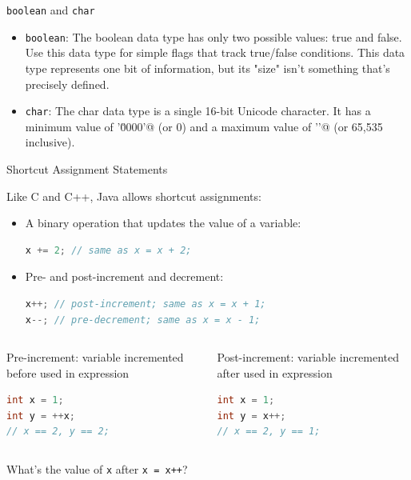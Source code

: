 \documentclass{beamer}
\begin{document}
\begin{frame}[fragile]{{\tt boolean} and {\tt char}}


\begin{itemize}
\item {\tt boolean}: The boolean data type has only two possible values: true and false. Use this data type for simple flags that track true/false conditions. This data type represents one bit of information, but its "size" isn't something that's precisely defined.

\item {\tt char}: The char data type is a single 16-bit Unicode character. It has a minimum value of \verb@'\u0000'@ (or 0) and a maximum value of \verb@'\uffff'@ (or 65,535 inclusive).
\end{itemize}


\end{frame}

\begin{frame}[fragile]{Shortcut Assignment Statements}


Like C and C++, Java allows shortcut assignments:
\begin{itemize}
\item A binary operation that updates the value of a variable:
\begin{lstlisting}[language=Java]
x += 2; // same as x = x + 2;
\end{lstlisting}
\item Pre- and post-increment and decrement:
\begin{lstlisting}[language=Java]
x++; // post-increment; same as x = x + 1;
x--; // pre-decrement; same as x = x - 1;
\end{lstlisting}

\end{itemize}
\begin{columns}
\begin{column}{2in}
Pre-increment: variable incremented before used in expression
\begin{lstlisting}[language=Java]
int x = 1;
int y = ++x;
// x == 2, y == 2;
\end{lstlisting}

\end{column}

\begin{column}{2in}
Post-increment: variable incremented after used in expression
\begin{lstlisting}[language=Java]
int x = 1;
int y = x++;
// x == 2, y == 1;
\end{lstlisting}
\end{column}

\end{columns}
What's the value of {\tt x} after {\tt x = x++}?
\end{frame}
\end{document}
